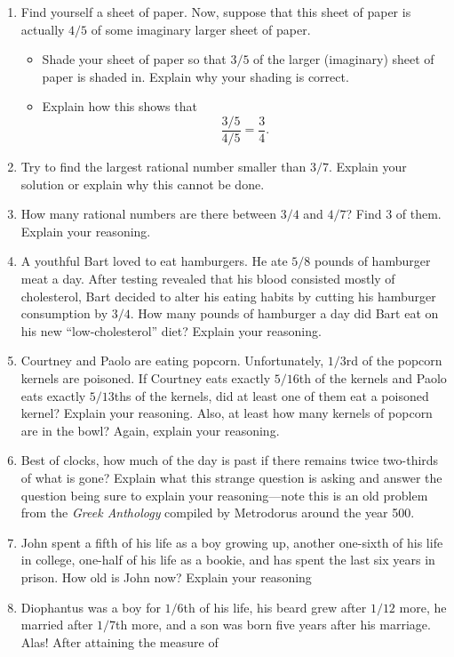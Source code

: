 \begin{problems}
\begin{enumerate}
\item Find yourself a sheet of paper. Now, suppose that this sheet of
  paper is actually $4/5$ of some imaginary larger sheet of
  paper. 
\begin{itemize}
\item Shade your sheet of paper so that $3/5$ of the larger
  (imaginary) sheet of paper is shaded in. Explain why your shading is
  correct.
\item Explain how this shows that 
\[
\frac{3/5}{4/5} = \frac{3}{4}.
\]
\end{itemize}
\item Try to find the largest rational number smaller than $3/7$.
  Explain your solution or explain why this cannot be done.
\item How many rational numbers are there between $3/4$ and $4/7$?
  Find $3$ of them. Explain your reasoning. 
\item A youthful Bart loved to eat hamburgers. He ate $5/8$ pounds of
  hamburger meat a day. After testing revealed that his blood
  consisted mostly of cholesterol, Bart decided to alter his eating
  habits by cutting his hamburger consumption by $3/4$. How many
  pounds of hamburger a day did Bart eat on his new
  ``low-cholesterol'' diet?  Explain your reasoning.
\item Courtney and Paolo are eating popcorn. Unfortunately, $1/3$rd 
  of the popcorn kernels are poisoned. If Courtney eats exactly $5/16$th 
  of the kernels and Paolo eats exactly $5/13$ths of the kernels, did at 
  least one of them eat a poisoned kernel?  Explain your reasoning.  Also, 
  at least how many kernels of popcorn are in the bowl? Again, explain 
  your reasoning.
\item Best of clocks, how much of the day is past if there remains
  twice two-thirds of what is gone? Explain what this strange question
  is asking and answer the question being sure to explain your
  reasoning---note this is an old problem from the \textit{Greek
    Anthology} compiled by Metrodorus around the year 500.
\item John spent a fifth of his life as a boy growing up, another
  one-sixth of his life in college, one-half of his life as a bookie,
  and has spent the last six years in prison. How old is John now?
  Explain your reasoning
\item Diophantus was a boy for $1/6$th of his life, his beard grew
  after $1/12$ more, he married after $1/7$th more, and a son was born
  five years after his marriage. Alas! After attaining the measure of

\end{enumerate}
\end{problems}

